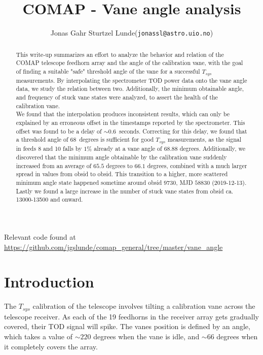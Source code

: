 \documentclass[10pt, a4paper]{article}
\begin{document}
\title{COMAP - Vane angle analysis}
\author{
    \begin{tabular}{r l}
        Jonas Gahr Sturtzel Lunde & (\texttt{jonassl@astro.uio.no})
    \end{tabular}}
\maketitle
Relevant code found at \url{https://github.com/jgslunde/comap_general/tree/master/vane_angle}
\vspace{0.7cm}


\renewcommand{\abstractname}{Summary}
\begin{abstract}
    \noindent
    This write-up summarizes an effort to analyze the behavior and relation of the COMAP telescope feedhorn array and the angle of the calibration vane, with the goal of finding a suitable "safe" threshold angle of the vane for a successful $T_{sys}$ measurements. By interpolating the spectrometer TOD power data onto the vane angle data, we study the relation between two. Additionally, the minimum obtainable angle, and frequency of stuck vane states were analyzed, to assert the health of the calibration vane. \\
    
    \noindent
    We found that the interpolation produces inconsistent results, which can only be explained by an erroneous offset in the timestamps reported by the spectrometer. This offset was found to be a delay of $\sim 0.6$ seconds. Correcting for this delay, we found that a threshold angle of $68$ degrees is sufficient for good $T_{sys}$ measurements, as the signal in feeds 8 and 10 falls by $1\%$ already at a vane angle of $68.88$ degrees. Additionally, we discovered that the minimum angle obtainable by the calibration vane suddenly increased from an average of $65.5$ degrees to $66.1$ degrees, combined with a much larger spread in values from obsid to obsid. This transition to a higher, more scattered minimum angle state happened sometime around obsid $9730$, MJD $58830$ (2019-12-13). Lastly we found a large increase in the number of stuck vane states from obsid ca. 13000-13500 and onward. 
\end{abstract}




\section{Introduction}
The $T_{sys}$ calibration of the telescope involves tilting a calibration vane across the telescope receiver. As each of the 19 feedhorns in the receiver array gets gradually covered, their TOD signal will spike. The vanes position is defined by an angle, which takes a value of $\sim 220$ degrees when the vane is idle, and $\sim 66$ degrees when it completely covers the array.
\end{document}
